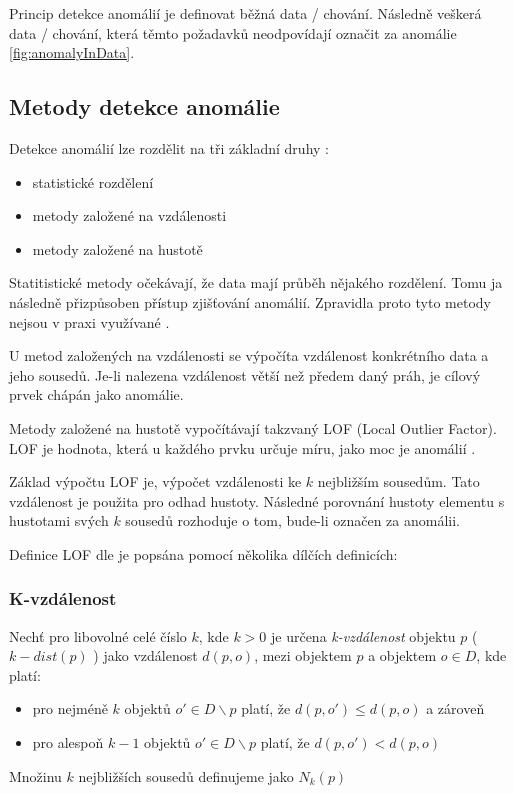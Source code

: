 \documentclass[thesis=M,czech]{FITthesis}[2012/10/20]
\begin{document}
		Princip detekce anomálií je definovat běžná data / chování. Následně veškerá data / chování, která těmto požadavků neodpovídají označit za anomálie \ref{fig:anomalyInData}. 
		
		\subsection{Metody detekce anomálie}
			Detekce anomálií lze rozdělit na tři základní druhy \cite{KumarPCAANom}: 
			\begin{itemize} 
				\item statistické rozdělení
				\item metody založené na vzdálenosti 
				\item metody založené na hustotě		
			\end{itemize}
		
			Statitistické metody očekávají, že data mají průběh nějakého rozdělení. Tomu ja následně přizpůsoben přístup zjišťování anomálií. Zpravidla proto tyto metody nejsou v praxi využívané \cite{KumarPCAANom}.
			
			U metod založených na vzdálenosti se výpočíta vzdálenost konkrétního data a jeho sousedů. Je-li nalezena vzdálenost větší než předem daný práh, je cílový prvek chápán jako anomálie.
			
			Metody založené na hustotě vypočítávají takzvaný LOF (Local Outlier Factor). LOF je hodnota, která u každého prvku určuje míru, jako moc je anomálií \cite{LOF}.
			
			Základ výpočtu LOF je, výpočet vzdálenosti ke $k$ nejbližším sousedům. Tato vzdálenost je použita pro odhad hustoty. Následné porovnání hustoty elementu s hustotami svých $k$ sousedů rozhoduje o tom, bude-li označen za anomálii.
			
			Definice LOF dle \cite{LOF} je popsána pomocí několika dílčích definicích: 
			
			\subsubsection{K-vzdálenost}
				Nechť pro libovolné celé číslo $k$, kde $k > 0$ je určena \textit{k-vzdálenost} objektu $p$ ( $k-dist(p)$ ) jako vzdálenost $d(p, o)$, mezi objektem $p$ a objektem $o \in D$, kde platí:
			
				\begin{itemize} 
					\item pro nejméně $k$ objektů $o' \in D \backslash {p}$	platí, že $d(p, o') \leq d(p, o)$ a zároveň
					\item pro alespoň $k-1$ objektů $o' \in D \backslash {p}$ platí, že $d(p, o') < d(p, o)$
				\end{itemize}
				Množinu $k$ nejbližších sousedů definujeme jako $N_k(p)$
		
\end{document}

